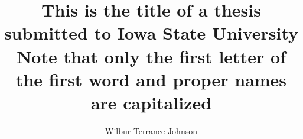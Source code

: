 \title{This is the title of a thesis
submitted to Iowa State University\\
Note that only the first letter of
the first word and proper names
are capitalized}
\author{Wilbur Terrance Johnson}
\notice
\maketitle
